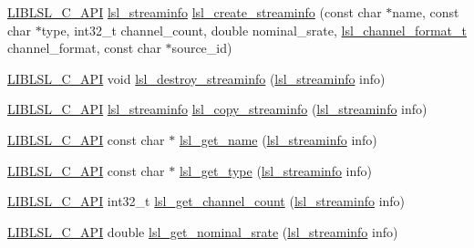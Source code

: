 \begin{DoxyCompactItemize}
\item 
\hyperlink{lsl__cpp_8h_aafd0ef1813e8be84a1420c4f1df64615}{L\+I\+B\+L\+S\+L\+\_\+\+C\+\_\+\+A\+PI} \hyperlink{namespacelsl_aa0a9ce9956061679949daa2e35aae2e8}{lsl\+\_\+streaminfo} \hyperlink{namespacelsl_abf20c6316cd58a713a674ef2213914d2}{lsl\+\_\+create\+\_\+streaminfo} (const char $\ast$name, const char $\ast$type, int32\+\_\+t channel\+\_\+count, double nominal\+\_\+srate, \hyperlink{namespacelsl_af188e978739868560b53dbf0ddd58e66}{lsl\+\_\+channel\+\_\+format\+\_\+t} channel\+\_\+format, const char $\ast$source\+\_\+id)
\item 
\hyperlink{lsl__cpp_8h_aafd0ef1813e8be84a1420c4f1df64615}{L\+I\+B\+L\+S\+L\+\_\+\+C\+\_\+\+A\+PI} void \hyperlink{namespacelsl_afc7ae71903a0c20763937739fa62df32}{lsl\+\_\+destroy\+\_\+streaminfo} (\hyperlink{namespacelsl_aa0a9ce9956061679949daa2e35aae2e8}{lsl\+\_\+streaminfo} info)
\item 
\hyperlink{lsl__cpp_8h_aafd0ef1813e8be84a1420c4f1df64615}{L\+I\+B\+L\+S\+L\+\_\+\+C\+\_\+\+A\+PI} \hyperlink{namespacelsl_aa0a9ce9956061679949daa2e35aae2e8}{lsl\+\_\+streaminfo} \hyperlink{namespacelsl_a354a91fa3a4c87cdf179443650425390}{lsl\+\_\+copy\+\_\+streaminfo} (\hyperlink{namespacelsl_aa0a9ce9956061679949daa2e35aae2e8}{lsl\+\_\+streaminfo} info)
\item 
\hyperlink{lsl__cpp_8h_aafd0ef1813e8be84a1420c4f1df64615}{L\+I\+B\+L\+S\+L\+\_\+\+C\+\_\+\+A\+PI} const char $\ast$ \hyperlink{namespacelsl_ad356f55776a73d03998837c5c32fc95e}{lsl\+\_\+get\+\_\+name} (\hyperlink{namespacelsl_aa0a9ce9956061679949daa2e35aae2e8}{lsl\+\_\+streaminfo} info)
\item 
\hyperlink{lsl__cpp_8h_aafd0ef1813e8be84a1420c4f1df64615}{L\+I\+B\+L\+S\+L\+\_\+\+C\+\_\+\+A\+PI} const char $\ast$ \hyperlink{namespacelsl_a417e01d26d64718513bc0ef2c58acf89}{lsl\+\_\+get\+\_\+type} (\hyperlink{namespacelsl_aa0a9ce9956061679949daa2e35aae2e8}{lsl\+\_\+streaminfo} info)
\item 
\hyperlink{lsl__cpp_8h_aafd0ef1813e8be84a1420c4f1df64615}{L\+I\+B\+L\+S\+L\+\_\+\+C\+\_\+\+A\+PI} int32\+\_\+t \hyperlink{namespacelsl_a40acd87a21d3c91a524bd72012dc3328}{lsl\+\_\+get\+\_\+channel\+\_\+count} (\hyperlink{namespacelsl_aa0a9ce9956061679949daa2e35aae2e8}{lsl\+\_\+streaminfo} info)
\item 
\hyperlink{lsl__cpp_8h_aafd0ef1813e8be84a1420c4f1df64615}{L\+I\+B\+L\+S\+L\+\_\+\+C\+\_\+\+A\+PI} double \hyperlink{namespacelsl_a17e4e6d432dc0b7280df4b5365c7da46}{lsl\+\_\+get\+\_\+nominal\+\_\+srate} (\hyperlink{namespacelsl_aa0a9ce9956061679949daa2e35aae2e8}{lsl\+\_\+streaminfo} info)

\end{DoxyCompactItemize}
